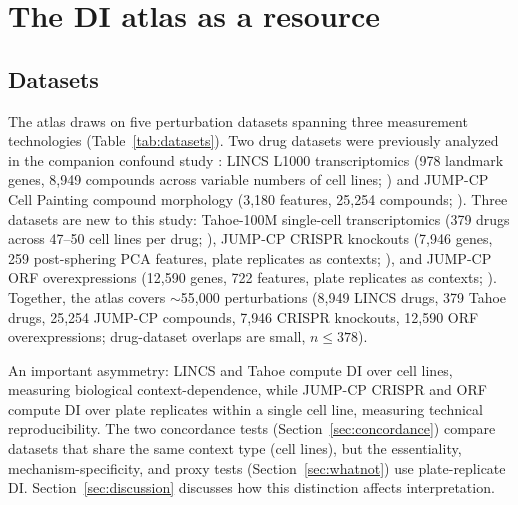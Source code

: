 \documentclass[11pt]{article}
\begin{document}
\section{The DI atlas as a resource}
\label{sec:atlas}

\subsection{Datasets}

The atlas draws on five perturbation datasets spanning three measurement
technologies (Table~\ref{tab:datasets}).  Two drug datasets were
previously analyzed in the companion confound study
\citep{tower2026confound}: LINCS L1000 transcriptomics (978 landmark
genes, 8{,}949 compounds across variable numbers of cell lines;
\citealp{subramanian2017next}) and JUMP-CP Cell Painting compound
morphology (3{,}180 features, 25{,}254 compounds;
\citealp{chandrasekaran2024cpjump1}).  Three datasets are new to this
study: Tahoe-100M single-cell transcriptomics (379 drugs across 47--50
cell lines per drug; \citealp{tahoe2025}), JUMP-CP CRISPR knockouts
(7{,}946 genes, 259 post-sphering PCA features, plate replicates as
contexts; \citealp{chandrasekaran2025morphmap}), and JUMP-CP ORF
overexpressions (12{,}590 genes, 722 features, plate replicates as
contexts; \citealp{chandrasekaran2025morphmap}).
Together, the atlas covers ${\sim}$55{,}000 perturbations (8{,}949
LINCS drugs, 379 Tahoe drugs, 25{,}254 JUMP-CP compounds, 7{,}946
CRISPR knockouts, 12{,}590 ORF overexpressions; drug-dataset overlaps
are small, $n \leq 378$).

An important asymmetry: LINCS and Tahoe compute DI over cell lines,
measuring biological context-dependence, while JUMP-CP CRISPR and ORF
compute DI over plate replicates within a single cell line, measuring
technical reproducibility.  The two concordance tests
(Section~\ref{sec:concordance}) compare datasets that share the same
context type (cell lines), but the essentiality, mechanism-specificity,
and proxy tests (Section~\ref{sec:whatnot}) use plate-replicate DI.
Section~\ref{sec:discussion} discusses how this distinction affects
interpretation.
\end{document}

